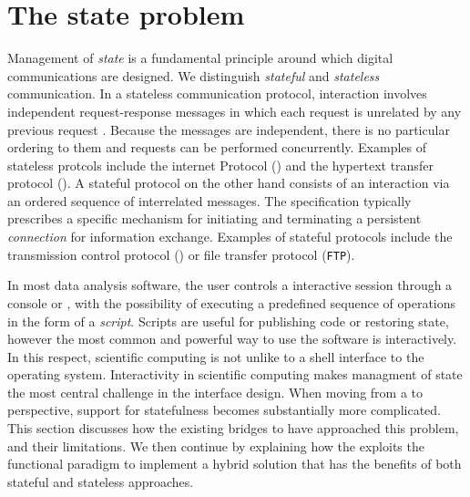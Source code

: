 \section{The state problem}

Management of \emph{state} is a fundamental principle around which digital communications are designed. We distinguish \emph{stateful} and \emph{stateless} communication. In a stateless communication protocol, interaction involves independent request-response messages in which each request is unrelated by any previous request \citep{hennessy2012computer}. Because the messages are independent, there is no particular ordering to them and requests can be performed concurrently. Examples of stateless protcols include the internet Protocol (\IP) and the hypertext transfer protocol (\HTTP). A stateful protocol on the other hand consists of an interaction via an ordered sequence of interrelated messages. The specification typically prescribes a specific mechanism for initiating and terminating a persistent \emph{connection} for information exchange. Examples of stateful protocols include the transmission control protocol (\TCP) or file transfer protocol (\texttt{FTP}).


In most data analysis software, the user controls a interactive session through a console or \GUI, with the possibility of executing a predefined sequence of operations in the form of a \emph{script}. Scripts are useful for publishing code or restoring state, however the most common and powerful way to use the software is interactively. In this respect, scientific computing is not unlike to a shell interface to the operating system. Interactivity in scientific computing makes managment of state the most central challenge in the interface design. When moving from a \UI to \API perspective, support for statefulness becomes substantially more complicated. This section discusses how the existing bridges to \R have approached this problem, and their limitations. We then continue by explaining how the \OpenCPU \API exploits the functional paradigm to implement a hybrid solution that has the benefits of both stateful and stateless approaches.

